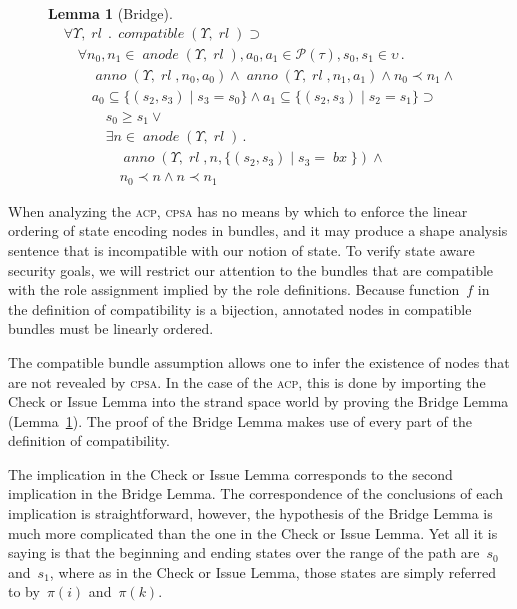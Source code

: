 \documentclass[titlepage,12pt]{article}
\newtheorem{lem}{Lemma}
\newcommand{\cpsa}{\textsc{cpsa}}
\newcommand{\acp}{\textsc{acp}}
\newcommand{\fn}[1]{\ensuremath{\operatorname{\mathit{#1}}}}
\newcommand{\all}[1]{\forall#1\mathpunct.}
\newcommand{\some}[1]{\exists#1\mathpunct.}
\newcommand{\pow}[1]{\mathcal P(#1)}
\newcommand{\rl}{\fn{rl}}
\begin{document}
\begin{figure}
\begin{lem}[Bridge]\label{lem:bridge}
$$\begin{array}{l}
\all{\Upsilon,\rl}
\fn{compatible}(\Upsilon,\rl)\supset{}\\
\quad\all{n_0,n_1\in\fn{anode}(\Upsilon,\rl),a_0,a_1\in\pow{\tau},
s_0,s_1\in\upsilon}\\
\qquad\fn{anno}(\Upsilon,\rl,n_0,a_0)\land
\fn{anno}(\Upsilon,\rl,n_1,a_1)\land n_0\prec n_1\land{}\\
\qquad a_0\subseteq\{(s_2,s_3)\mid s_3=s_0\}\land
a_1\subseteq\{(s_2,s_3)\mid s_2=s_1\}\supset{}\\
\qquad\quad s_0\geq s_1\lor{}\\
\qquad\quad\some{n\in\fn{anode}(\Upsilon,\rl)}\\
\qquad\qquad\fn{anno}(\Upsilon,\rl,n,\{(s_2,s_3)\mid
s_3=\fn{bx}\})\land{}\\
\qquad\qquad n_0\prec n\land n\prec n_1
\end{array}$$
\end{lem}
\end{figure}

When analyzing the {\acp}, {\cpsa} has no means by which to enforce
the linear ordering of state encoding nodes in bundles, and it may
produce a shape analysis sentence that is incompatible with our notion
of state.  To verify state aware security goals, we will restrict our
attention to the bundles that are compatible with the role assignment
implied by the role definitions.  Because function~$f$ in the
definition of compatibility is a bijection, annotated nodes in
compatible bundles must be linearly ordered.

The compatible bundle assumption allows one to infer the existence of
nodes that are not revealed by {\cpsa}.  In the case of the {\acp},
this is done by importing the Check or Issue Lemma into the strand space
world by proving the Bridge Lemma (Lemma~\ref{lem:bridge}).
The proof of the Bridge Lemma makes use of every part of the
definition of compatibility.

The implication in the Check or Issue Lemma corresponds to the second
implication in the Bridge Lemma.  The correspondence of the
conclusions of each implication is straightforward, however, the
hypothesis of the Bridge Lemma is much more complicated than the one
in the Check or Issue Lemma.  Yet all it is saying is that the
beginning and ending states over the range of the path are~$s_0$
and~$s_1$, where as in the Check or Issue Lemma, those states are
simply referred to by~$\pi(i)$ and~$\pi(k)$.
\end{document}
